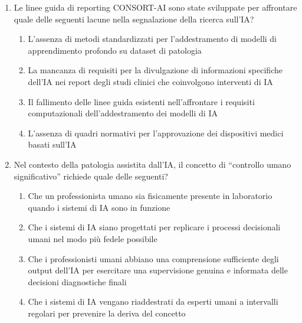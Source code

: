 \begin{enumerate}
    \item \label{ch5:q6} Le linee guida di reporting CONSORT-AI sono state sviluppate per affrontare quale delle seguenti lacune nella segnalazione della ricerca sull'IA?
    \begin{enumerate}[label=\Alph*.]
        \item L'assenza di metodi standardizzati per l'addestramento di modelli di apprendimento profondo su dataset di patologia
        \item La mancanza di requisiti per la divulgazione di informazioni specifiche dell'IA nei report degli studi clinici che coinvolgono interventi di IA
        \item Il fallimento delle linee guida esistenti nell'affrontare i requisiti computazionali dell'addestramento dei modelli di IA
        \item L'assenza di quadri normativi per l'approvazione dei dispositivi medici basati sull'IA
    \end{enumerate}

    \item \label{ch5:q7} Nel contesto della patologia assistita dall'IA, il concetto di ``controllo umano significativo'' richiede quale delle seguenti?
    \begin{enumerate}[label=\Alph*.]
        \item Che un professionista umano sia fisicamente presente in laboratorio quando i sistemi di IA sono in funzione
        \item Che i sistemi di IA siano progettati per replicare i processi decisionali umani nel modo più fedele possibile
        \item Che i professionisti umani abbiano una comprensione sufficiente degli output dell'IA per esercitare una supervisione genuina e informata delle decisioni diagnostiche finali
        \item Che i sistemi di IA vengano riaddestrati da esperti umani a intervalli regolari per prevenire la deriva del concetto
    \end{enumerate}


\end{enumerate}
